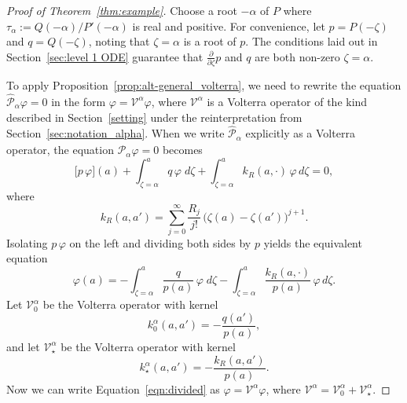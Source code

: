\documentclass{article}
\theoremstyle{definition}
\theoremstyle{plain}
\newcommand{\volterra}{\mathcal{V}}
\newcommand{\hardpart}{\mathcal{V}_0}
\newcommand{\softpart}{\mathcal{V}_\star}
\newcommand{\hardker}{k_0}
\newcommand{\softker}{k_\star}
\begin{document}
\begin{proof}[Proof of Theorem~\ref{thm:example}]
Choose a root $-\alpha$ of $P$ where $\tau_\alpha := Q(-\alpha)/P'(-\alpha)$ is real and positive. For convenience, let $p = P(-\zeta)$ and $q = Q(-\zeta)$, noting that $\zeta = \alpha$ is a root of $p$. The conditions laid out in Section~\ref{sec:level 1 ODE} guarantee that $\frac{\partial}{\partial \zeta} p$ and $q$ are both non-zero $\zeta = \alpha$.

To apply Proposition~\ref{prop:alt-general_volterra}, we need to rewrite the equation $\hat{\mathcal{P}}_{\alpha}\varphi = 0$ in the form $\varphi = \volterra^\alpha \varphi$, where $\volterra^\alpha$ is a Volterra operator of the kind described in Section~\ref{setting} under the reinterpretation from Section~\ref{sec:notation_alpha}. When we write $\hat{\mathcal{P}}_\alpha$ explicitly as a Volterra operator, the equation $\hat{\mathcal{P}}_{\alpha} \varphi = 0$ becomes
\[ \big[ p\, \varphi \big](a) + \int_{\zeta=\alpha}^a q \, \varphi \; d\zeta + \int_{\zeta=\alpha}^a k_R(a,\cdot) \, \varphi \, d\zeta = 0, \]
where
\[ k_R(a,a')=\sum_{j=0}^\infty \frac{R_{j}}{j!} \, \big(\zeta(a)-\zeta(a')\big)^{j+1} . \]
Isolating $p\,\varphi$ on the left and dividing both sides by $p$ yields the equivalent equation
\begin{equation}\label{eqn:divided}
\varphi(a) = -\int_{\zeta=\alpha}^a \frac{q}{p(a)} \, \varphi \; d\zeta - \int_{\zeta=\alpha}^a \frac{k_R(a,\cdot)}{p(a)} \, \varphi \, d\zeta.
\end{equation}
Let $\hardpart^\alpha$ be the Volterra operator with kernel
\[ \hardker^\alpha(a,a') = -\frac{q(a')}{p(a)}, \]
and let $\softpart^\alpha$ be the Volterra operator with kernel
\[ \softker^\alpha(a,a') = -\frac{k_R(a,a')}{p(a)}. \]
Now we can write Equation~\eqref{eqn:divided} as $\varphi = \volterra^\alpha \varphi$, where $\volterra^\alpha = \hardpart^\alpha + \softpart^\alpha$.


\end{proof}
\end{document}
